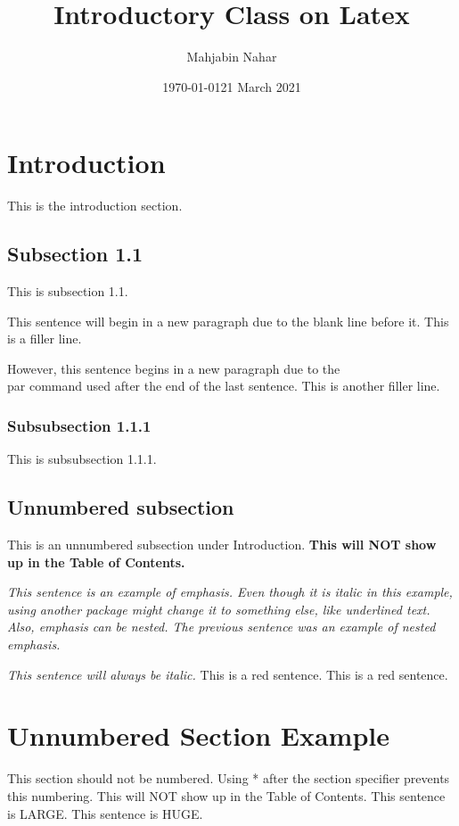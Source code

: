 \documentclass[14pt, a4paper]{article} %
\title{Introductory Class on Latex}
\author{Mahjabin Nahar}
\date{\today}
\date{21 March 2021}
\begin{document}
\maketitle
\tableofcontents %
\pagebreak %

\section{Introduction}
This is the introduction section.

\subsection{Subsection 1.1}
This is subsection 1.1.

This sentence will begin in a new paragraph due to the blank line before it. This is a filler line.\par
However, this sentence begins in a new paragraph due to the \\par command used after the end of the last sentence. This is another filler line.

\subsubsection{Subsubsection 1.1.1}
This is subsubsection 1.1.1.

\subsection*{Unnumbered subsection}
This is an unnumbered subsection under Introduction. \textbf{This will NOT show up in the Table of Contents.} 

\emph{This sentence is an example of emphasis. Even though it is italic in this example, using another package might change it to something else, like underlined text.  \emph{Also, emphasis can be nested.} The previous sentence was an example of nested emphasis.} 

\textit{This sentence will always be italic.}
\color{red} This is a red sentence. %
{\color{red} This is a red sentence.} %


\section*{Unnumbered Section Example}
This section should not be numbered. Using * after the section specifier prevents this numbering. This will NOT show up in the Table of Contents.
\LARGE{This sentence is LARGE.}
\Huge{This sentence is HUGE.}
\end{document}
